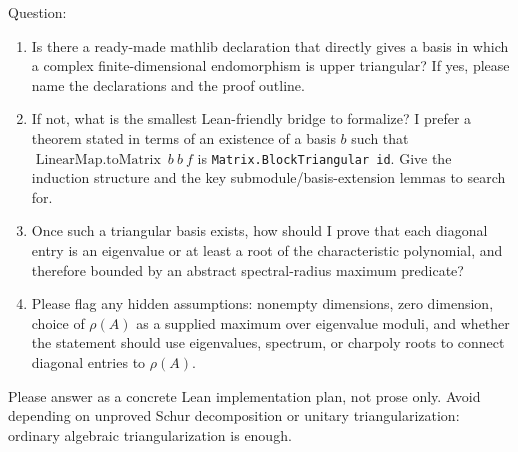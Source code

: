 Question:

\begin{enumerate}
\item Is there a ready-made mathlib declaration that directly gives a basis in
which a complex finite-dimensional endomorphism is upper triangular? If yes,
please name the declarations and the proof outline.
\item If not, what is the smallest Lean-friendly bridge to formalize? I prefer
a theorem stated in terms of an existence of a basis \(b\) such that
\(\operatorname{LinearMap.toMatrix}\ b\ b\ f\) is
\texttt{Matrix.BlockTriangular id}. Give the induction structure and the key
submodule/basis-extension lemmas to search for.
\item Once such a triangular basis exists, how should I prove that each diagonal
entry is an eigenvalue or at least a root of the characteristic polynomial, and
therefore bounded by an abstract spectral-radius maximum predicate?
\item Please flag any hidden assumptions: nonempty dimensions, zero dimension,
choice of \(\rho(A)\) as a supplied maximum over eigenvalue moduli, and whether
the statement should use eigenvalues, spectrum, or charpoly roots to connect
diagonal entries to \(\rho(A)\).
\end{enumerate}

Please answer as a concrete Lean implementation plan, not prose only. Avoid
depending on unproved Schur decomposition or unitary triangularization: ordinary
algebraic triangularization is enough.
